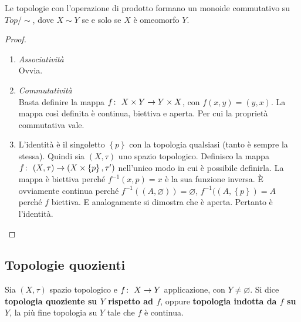 \begin{theorem}
	Le topologie con l'operazione di prodotto formano un monoide commutativo su $Top/\sim$, dove $X\sim Y$ se e solo se $X$ è omeomorfo $Y$.
\end{theorem}
\begin{proof} \
	\begin{enumerate}
		\item \textit{Associatività} \\Ovvia.
		\item \textit{Commutatività} \\Basta definire la mappa $f \colon\ X\times Y \rightarrow Y \times X$, con $f(x,y) = (y,x)$. La mappa così definita è continua, biettiva e aperta. Per cui la proprietà commutativa vale.
		\item L'identità è il singoletto $\left\{p\right\}$ con la topologia qualsiasi (tanto è sempre la stessa). Quindi sia $(X, \tau)$ uno spazio topologico. Definisco la mappa $f \colon\ (X, \tau) \rightarrow (X\times \left\{p\right\}, \tau')$ nell'unico modo in cui è possibile definirla. La mappa è biettiva perché $f^{-1}(x, p) = x$ è la sua funzione inversa. È ovviamente continua perché $f^{-1}((A, \varnothing)) = \varnothing$, $f^{-1}((A, \left\{p\right\})= A$ perché $f$ biettiva. E analogamente si dimostra che è aperta. Pertanto è l'identità. 
	\end{enumerate}
\end{proof}



\subsection{\textcolor{TopGener}{\textbf{Topologie quozienti}}}



\begin{definition}
	Sia $(X, \tau)$ spazio topologico e $f \colon\ X \rightarrow Y$ applicazione, con $Y \neq \varnothing$. Si dice\textbf{ topologia quoziente su $Y$ rispetto ad $f$}, oppure \textbf{topologia indotta da $f$ su $Y$}, la più fine topologia su $Y$ tale che $f$ è continua. 
\end{definition}

